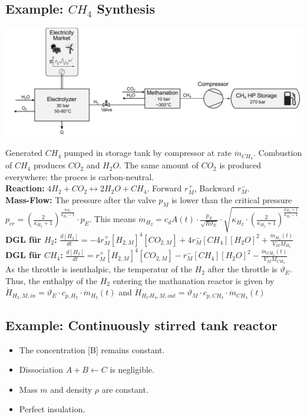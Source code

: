\documentclass[10pt,a4paper]{scrartcl}
\begin{document}
\begin{multicols*}{3}
\subsection{Example: $CH_4$ Synthesis}
\begin{center}\includegraphics[width=0.65\columnwidth]{synt.png}\end{center}
Generated $CH_4$ pumped in storage tank by compressor at rate $\dot{m}_{CH_4}$. Combustion of $CH_4$ produces $CO_2$ and $H_2O$. The same amount of $CO_2$ is produced everywhere: the proces is carbon-neutral.\\
\textbf{Reaction:} $4H_2+CO_2\leftrightarrow 2H_2O+CH_4$, Forward $r_M^+$, Backward $r_M^-$. \\
\textbf{Mass-Flow:} The pressure after the valve $p_M$ is lower than the critical pressure $p_{cr}=\left( \frac{2}{\kappa_{H_2}+1} \right)^{\frac{\kappa_{H_2}}{\kappa_{H_2}-1}}\cdot p_E$. This means $\dot{m}_{H_2}=c_dA(t)\cdot \frac{p_E}{\sqrt{R\vartheta_E}}\cdot \sqrt{\kappa_{H_2}\cdot \left( \frac{2}{\kappa_{H_2}+1} \right)^{\frac{\kappa_{H_2}+1}{\kappa_{H_2}-1}}}$\\
\textbf{DGL f\"ur $H_2$:} $\frac{d[H_2]}{dt}=-4r_M^+[H_{2,M}]^4[CO_{2,M}]+4r_M^-[CH_4][H_2O]^2+\frac{\dot{m}_{H_2}(t)}{V_MM_{H_2}}$\\
\textbf{DGL f\"ur $CH_4$:} $\frac{d[H_2]}{dt}=r_M^+[H_{2,M}]^4[CO_{2,M}]-r_M^-[CH_4][H_2O]^2-\frac{\dot{m}_{CH_4}(t)}{V_MM_{CH_4}}$\\
As the throttle is isenthalpic, the temperatur of the $H_2$ after the throttle is $\vartheta_E$. Thus, the enthalpy of the $H_2$ entering the mathanation reactor is given by $\dot{H}_{H_2,M,in}=\vartheta_E\cdot c_{p,H_2}\cdot \dot{m}_{H_2}(t)$ and $\dot{H}_{H_CH_4,M,out}=\vartheta_M\cdot c_{p,CH_4}\cdot \dot{m}_{CH_4}(t)$

\subsection{Example: Continuously stirred tank reactor}

\begin{itemize}
\item The concentration [B] remains constant.
\item Dissociation $A+B\leftarrow C$ is negligible.
\item Mass $m$ and density $\rho$ are constant.
\item Perfect insulation.
\end{itemize}


\end{multicols*}
\end{document}
